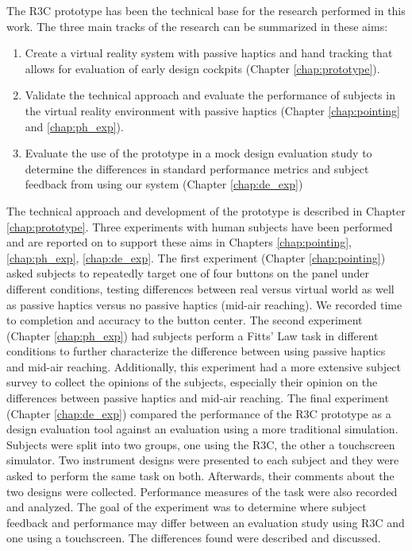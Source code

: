 The R3C prototype has been the technical base for the research performed in this work.
The three main tracks of the research can be summarized in these aims:
\begin{enumerate}
    \item Create a virtual reality system with passive haptics and hand tracking that allows for evaluation of early design cockpits (Chapter \ref{chap:prototype}).
    \item Validate the technical approach and evaluate the performance of subjects in the virtual reality environment with passive haptics (Chapter \ref{chap:pointing} and \ref{chap:ph_exp}).
    \item Evaluate the use of the prototype in a mock design evaluation study to determine the differences in standard performance metrics and subject feedback from using our system (Chapter \ref{chap:de_exp})
\end{enumerate}
The technical approach and development of the prototype is described in Chapter \ref{chap:prototype}.
Three experiments with human subjects have been performed and are reported on to support these aims in Chapters \ref{chap:pointing}, \ref{chap:ph_exp}, \ref{chap:de_exp}.
The first experiment (Chapter \ref{chap:pointing}) asked subjects to repeatedly target one of four buttons on the panel under different conditions, testing differences between real versus virtual world as well as passive haptics versus no passive haptics (mid-air reaching).
We recorded time to completion and accuracy to the button center.
The second experiment (Chapter \ref{chap:ph_exp}) had subjects perform a Fitts' Law task in different conditions to further characterize the difference between using passive haptics and mid-air reaching.
Additionally, this experiment had a more extensive subject survey to collect the opinions of the subjects, especially their opinion on the differences between passive haptics and mid-air reaching.
The final experiment (Chapter \ref{chap:de_exp}) compared the performance of the R3C prototype as a design evaluation tool against an evaluation using a more traditional simulation.
Subjects were split into two groups, one using the R3C, the other a touchscreen simulator.
Two instrument designs were presented to each subject and they were asked to perform the same task on both.
Afterwards, their comments about the two designs were collected.
Performance measures of the task were also recorded and analyzed.
The goal of the experiment was to determine where subject feedback and performance may differ between an evaluation study using R3C and one using a touchscreen.
The differences found were described and discussed.


